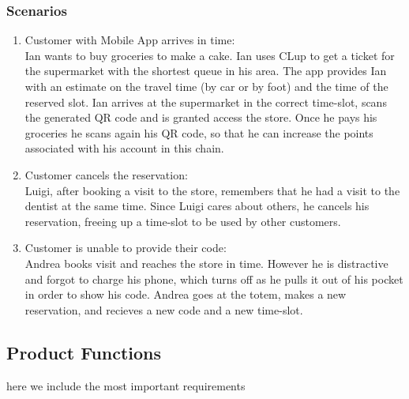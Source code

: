 \subsubsection{Scenarios}
    \begin{enumerate}[label=\Alph*.]
        \item Customer with Mobile App arrives in time:\\
            Ian wants to buy groceries to make a cake. Ian uses CLup to get a ticket for the supermarket with the shortest queue in his area.
            The app provides Ian with an estimate on the travel time (by car or by foot) and the time of the reserved slot. 
            Ian arrives at the supermarket in the correct time-slot, scans the generated QR code and is granted access the store. Once he pays
            his groceries he scans again his QR code, so that he can increase the points associated with his account in this chain.
        \item Customer cancels the reservation:\\
            Luigi, after booking a visit to the store, remembers that he had a visit to the dentist at the same time.
            Since Luigi cares about others, he cancels his reservation, freeing up a time-slot to be used by other customers.
        \item Customer is unable to provide their code:\\
            Andrea books visit and reaches the store in time.
            However he is distractive and forgot to charge his phone, which turns off as he pulls it out of his pocket in order to show his code.
            Andrea goes at the totem, makes a new reservation, and recieves a new code and a new time-slot.
    \end{enumerate}






\subsection{Product Functions}
here we include the most important requirements

